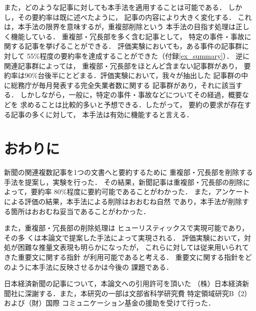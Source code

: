 また，どのような記事に対しても本手法を適用することは可能である．
しかし，その要約率は既に述べたように，
記事の内容により大きく変化する．
これは，本手法の限界を意味するが，重複部削除という
本手法の目指す処理は正しく機能している．
重複部・冗長部を多く含む記事として，
特定の事件・事故に関する記事を挙げることができる．
評価実験においても，ある事件の記事群に対して
55\%程度の要約率を達成することができた（付録\ref{ex_summary}）．
逆に関連記事群によっては，
重複部・冗長部をほとんど含まない記事群があり，
要約率は90\%台後半にとどまる．評価実験において，我々が抽出した
記事群の中に総務庁が毎月発表する完全失業者数に関する
記事群があり，それに該当する．
しかしながら，一般に，特定の事件・事故などについてその経過，概要などを
求めることは比較的多いと予想できる．したがって，
要約の要求が存在する記事の多くに対して，
本手法は有効に機能すると言える．

\section{おわりに}
新聞の関連複数記事を1つの文書へと要約するために
重複部・冗長部を削除する手法を提案し，実験を行った．
その結果，新聞記事は重複部・冗長部の削除によって，要約率
80\%程度に要約可能であることがわかった．
また，アンケートによる評価の結果，本手法による削除はおおむね自然
であり，本手法が削除する箇所はおおむね妥当であることがわかった．

また，重複部・冗長部の削除処理は
ヒューリスティックスで実現可能であり，その多
くは本論文で提案した手法によって実現される．
評価実験において，対処が困難な推量文表現も明らかになったが，
これらに対しては従来用いられてきた重要文に関する指針\cite{Okumura98}
が利用可能であると考える．
重要文に関する指針をどのように本手法に反映させるかは今後の
課題である．

\acknowledgment
日本経済新聞の記事について，本論文への引用許可を頂いた
（株）日本経済新聞社に深謝する．また，本研究の一部は文部省科学研究費
特定領域研究B（2）および（財）国際
コミュニケーション基金の援助を受けて行った．

\appendix
